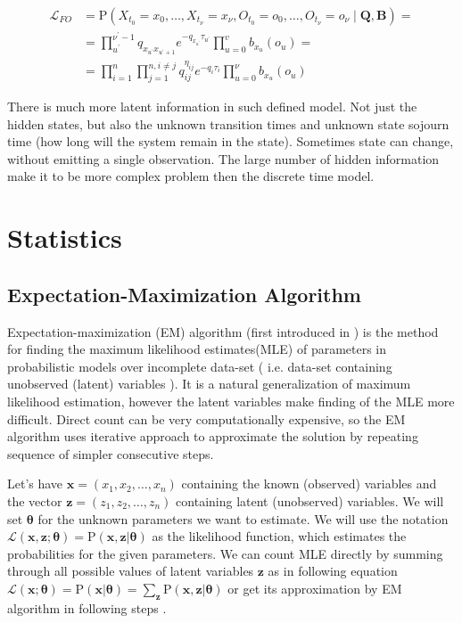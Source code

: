 \documentclass[thesis=M,english]{FITthesis}[2012/10/20]
\newcommand{\matr}[1]{\mathbf{#1}}
\begin{document}
\begin{equation}\label{eq:HMCL1}
\begin{aligned} 
			\mathcal{L}_{FO} &= \mathrm{P}(X_{t_0} = x_0, \dots ,X_{t_\nu} = x_\nu, O_{t_0} = o_0, \dots ,O_{t_\nu} = o_\nu \mid \matr{Q}, \matr{B} ) = \\
  &= \prod_{u^{'}}^{\nu^{'}-1} q_{x_{u^{'}} x_{u^{'}+1}} e^{ - q_{x_{u^{'}}} \tau_{u^{'}} } 
    \prod_{u=0}^v b_{ x_u }(o_u) = \\
    &= \prod_{i=1}^{n} \prod_{j=1}^{n, i \neq j} q_{ij}^{\eta_{ij} } e^{ - q_i \tau_i } \prod_{u=0}^\nu b_{x_u}(o_u)
\end{aligned}
\end{equation}

There is much more latent information in such defined model. Not just the hidden states, but also the unknown transition times and unknown state sojourn time (how long will the system remain in the state).
Sometimes state can change, without emitting a single observation. The large number of hidden information make it to be more complex problem then the discrete time model.

\chapter{Statistics}\label{ch:s}


\section{Expectation-Maximization Algorithm}\label{ch:EM}

Expectation-maximization (EM) algorithm (first introduced in \cite{De77}) is the method for finding the maximum likelihood estimates(MLE) of parameters in probabilistic models over incomplete data-set ( i.e. data-set containing unobserved (latent) variables ). It is a natural generalization of maximum likelihood estimation, however the latent variables make finding of the MLE more difficult. Direct count can be very computationally expensive, so the EM algorithm uses iterative approach to approximate the solution by repeating sequence of simpler consecutive steps.

Let's have $\mathbf{x} = (x_{1},x_{2},\dotsc,x_{n})$ containing the known (observed) variables and the vector $\mathbf{z} = (z_{1},z_{2},\dotsc,z_{n})$ containing latent (unobserved) variables. We will set $\boldsymbol{\theta}$ for the unknown parameters we want to estimate. We will use the notation $\mathcal{L}(\mathbf{x},\mathbf{z}; \boldsymbol{\theta}) = \mathrm{P}(\mathbf{x},\mathbf{z} | \boldsymbol{\theta})$ as the likelihood function, which estimates the probabilities for the given parameters. We can count MLE directly by summing through all possible values of latent variables $\matr{z}$ as in following equation $\mathcal{L}(\mathbf{x};\boldsymbol{\theta}) = \mathrm{P}(\mathbf{x} | \boldsymbol{\theta}) = \sum\limits_{\matr{z}} \mathrm{P}(\mathbf{x},\mathbf{z} | \boldsymbol{\theta})$ or get its approximation by EM algorithm in following steps \cite{Li14}.
\end{document}
